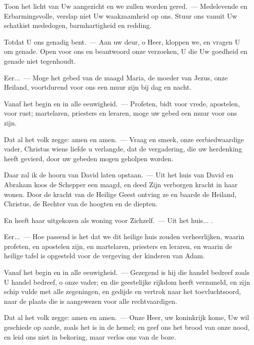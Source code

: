 \documentclass[12pt,twoside,a5paper]{article}
\begin{document}
\begin{halfparskip}
   Toon het licht van Uw aangezicht en we zullen worden gered.~--- Medelevende en Erbarmingsvolle, verslap niet Uw waakzaamheid op ons. Stuur ons vanuit Uw schatkist mededogen, barmhartigheid en redding.

  Totdat U ons genadig bent.~--- Aan uw deur, o Heer, kloppen we, en vragen U om genade. Open voor ons en beantwoord onze verzoeken, U die Uw goedheid en genade niet tegenhoudt.

  Eer...~--- Moge het gebed van de maagd Maria, de moeder van Jezus, onze Heiland, voortdurend voor ons een muur zijn bij dag en nacht.

  Vanaf het begin en in alle eeuwigheid.~--- Profeten, bidt voor vrede, apostelen, voor rust; martelaren, priesters en leraren, moge uw gebed een muur voor ons zijn.

  Dat al het volk zegge: amen en amen.~--- Vraag en smeek, onze eerbiedwaardige vader, Christus wiens liefde u verlangde, dat de vergadering, die uw herdenking heeft gevierd, door uw gebeden mogen geholpen worden.
\end{halfparskip}

\begin{halfparskip}
   Daar zal ik de hoorn van David laten opstaan.~--- Uit het huis van David en Abraham koos de Schepper een maagd, en deed Zijn verborgen kracht in haar wonen. Door de kracht van de Heilige Geest ontving ze en baarde de Heiland, Christus, de Rechter van de hoogten en de diepten.

  En heeft haar uitgekozen als woning voor Zichzelf.~--- Uit het huis... .

  Eer...~--- Hoe passend is het dat we dit heilige huis zouden verheerlijken, waarin profeten, en apostelen zijn, en martelaren, priesters en leraren, en waarin de heilige tafel is opgesteld voor de vergeving der kinderen van Adam.

  Vanaf het begin en in alle eeuwigheid.~--- Gezegend is hij die handel bedreef zoals U handel bedreef, o onze vader; en die geestelijke rijkdom heeft verzameld, en zijn schip vulde met alle zegeningen, en gedijde en vertrok naar het toevluchtsoord, naar de plaats die is aangewezen voor alle rechtvaardigen.

  Dat al het volk zegge: amen en amen.~--- Onze Heer, uw koninkrijk kome, Uw wil geschiede op aarde, zoals het is in de hemel; en geef ons het brood van onze nood, en leid ons niet in bekoring, maar verlos ons van de boze.
\end{halfparskip}
\end{document}

